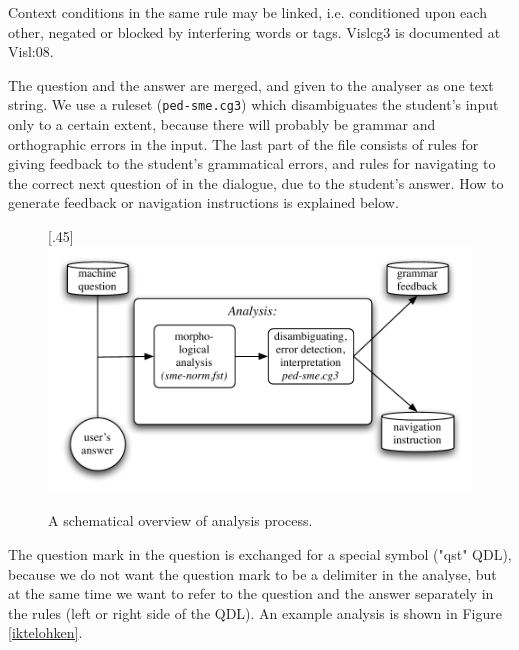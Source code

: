 \documentclass[11pt]{article}
\begin{document}
Context conditions in the same rule may be linked, i.e. conditioned upon each other, negated or blocked by interfering words or tags. Vislcg3 is documented at {Visl:08}.

The question and the answer are merged, and given to the analyser as one text string. We use a ruleset (\texttt{ped-sme.cg3}) which disambiguates the student's input only to a certain extent, because there will probably be grammar and orthographic errors in the input. The last part of the file consists of rules for giving feedback to the student's grammatical errors, and rules for navigating to the correct next question of in the dialogue, due to the student's answer. How to generate feedback or navigation instructions is explained below.


\begin{figure}[htbp]
\begin{center}
\scalebox{.45}[.45]{\includegraphics{presentation/img/qa2.pdf}}
\caption{A schematical overview of analysis process.}
\label{qasystem}
\end{center}
\end{figure}

The question mark in the question is exchanged for a special symbol ("qst" QDL), because we do not want the question mark to be a delimiter in the analyse, but at the same time we want to refer to the question and the answer separately in the rules (left or right side of the QDL). An example analysis is shown in Figure \ref{iktelohken}.
\end{document}
